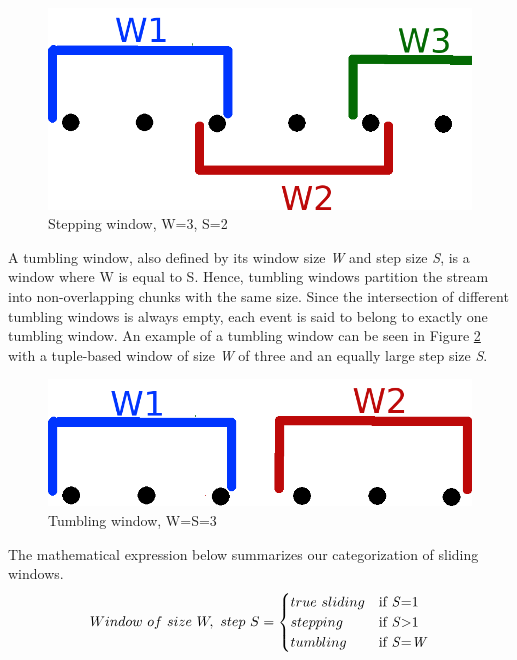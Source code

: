\begin{figure}[!htb]
    \begin{center}
      \includegraphics[scale=0.3]{figures/stepping.png}
      \caption[Stepping window]{Stepping window, W=3, S=2}
      \label{fig:stepping-window}
    \end{center}
\end{figure}

A tumbling window, also defined by its window size \textit{W} and step size \textit{S}, is a window where W is equal to S. Hence, tumbling windows partition the stream into non-overlapping chunks with the same size. Since the intersection of different tumbling windows is always empty, each event is said to belong to exactly one tumbling window. An example of a tumbling window can be seen in Figure \ref{fig:tumbling-window} with a tuple-based window of size \textit{W} of three and an equally large step size \textit{S}.

\begin{figure}[!htb]
    \begin{center}
      \includegraphics[scale=0.3]{figures/tumbling.png}
      \caption[Tumbling window]{Tumbling window, W=S=3}
      \label{fig:tumbling-window}
    \end{center}
\end{figure}

The mathematical expression below summarizes our categorization of sliding windows.
\begin{equation} 
  Window \,\, of \,\, size \,\, W, \,\, step \,\, S =
    \begin{cases}
      true \,\, sliding & \text{if \textit{S}=1}\\
      stepping & \text{if \textit{S}>1}\\
      tumbling & \text{if \textit{S}=\textit{W}}
    \end{cases}
\end{equation}

